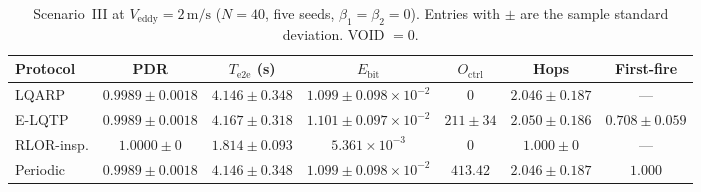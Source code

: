 
\begin{table}[!t]
\caption{Scenario~III at $V_{\mathrm{eddy}}=2\,\mathrm{m/s}$
($N=40$, five seeds, $\beta_1=\beta_2=0$). Entries with $\pm$ are
the sample standard deviation. VOID $=0$.}
\label{tab:s3_protocols}
\centering
\small
\begin{tabular}{lcccccc}
\hline
Protocol & PDR & $T_{\mathrm{e2e}}$ (s) & $E_{\mathrm{bit}}$
  & $O_{\mathrm{ctrl}}$ & Hops & First-fire \\
\hline
LQARP & $0.9989\pm 0.0018$ & $4.146\pm 0.348$ & $1.099\pm 0.098\times 10^{-2}$
  & $0$ & $2.046\pm 0.187$ & --- \\
E-LQTP & $0.9989\pm 0.0018$ & $4.167\pm 0.318$ & $1.101\pm 0.097\times 10^{-2}$
  & $211\pm 34$ & $2.050\pm 0.186$ & $0.708\pm 0.059$ \\
RLOR-insp. & $1.0000\pm 0$ & $1.814\pm 0.093$ & $5.361\times 10^{-3}$
  & $0$ & $1.000\pm 0$ & --- \\
Periodic & $0.9989\pm 0.0018$ & $4.146\pm 0.348$ & $1.099\pm 0.098\times 10^{-2}$
  & $413.42$ & $2.046\pm 0.187$ & $1.000$ \\
\hline
\end{tabular}
\end{table}
